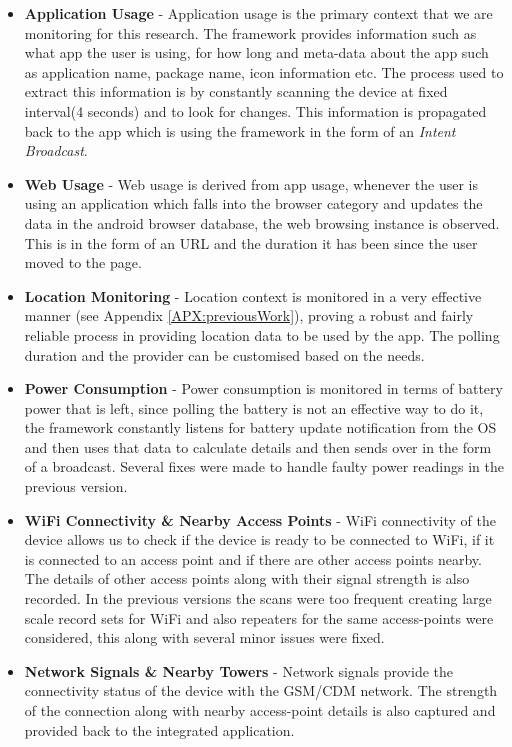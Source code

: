 \documentclass[prodmode,acmtecs]{acmsmall}
\begin{document}
\begin{itemize}
\item \textbf{Application Usage} - Application usage is the primary context that we are monitoring for this research. The framework provides information such as what app the user is using, for how long and meta-data about the app such as application name, package name, icon information etc. The process used to extract this information is by constantly scanning the device at fixed interval(4 seconds) and to look for changes. This information is propagated back to the app which is using the framework in the form of an \textit{Intent Broadcast}.

\item \textbf{Web Usage} - Web usage is derived from app usage, whenever the user is using an application which falls into the browser category and updates the data in the android browser database, the web browsing instance is observed. This is in the form of an URL and the duration it has been since the user moved to the page.

\item \textbf{Location Monitoring} - Location context is monitored in a very effective manner (see Appendix \ref{APX:previousWork}), proving a robust and fairly reliable process in providing location data to be used by the app. The polling duration and the provider can be customised based on the needs.

\item \textbf{Power Consumption} - Power consumption is monitored in terms of battery power that is left, since polling the battery is not an effective way to do it, the framework constantly listens for battery update notification from the OS and then uses that data to calculate details and then sends over in the form of a broadcast. Several fixes were made to handle faulty power readings in the previous version.

\item \textbf{WiFi Connectivity \& Nearby Access Points} - WiFi connectivity of the device allows us to check if the device is ready to be connected to WiFi, if it is connected to an access point and if there are other access points nearby. The details of other access points along with their signal strength is also recorded. In the previous versions the scans were too frequent creating large scale record sets for WiFi and also repeaters for the same access-points were considered, this along with several minor issues were fixed.

\item \textbf{Network Signals \& Nearby Towers} - Network signals provide the connectivity status of the device with the GSM/CDM network. The strength of the connection along with nearby access-point details is also captured and provided back to the integrated application.


\end{itemize}
\end{document}
